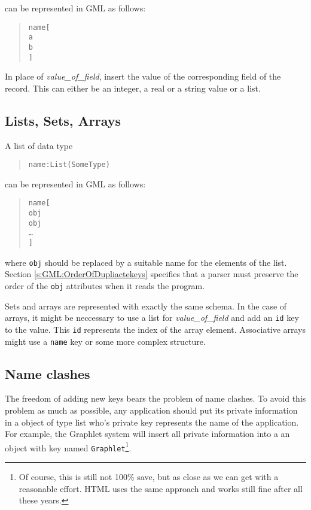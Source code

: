 \noindent can be represented in GML as follows:

\begin{quote}
\begin{alltt}
name [
    a 
    b 
    \ttcomment{\ldots{}}
]
\end{alltt}
\end{quote}

\noindent In place of \emph{value\_of\_field}, insert the value of
the corresponding field of the record. This can either be an
integer, a real or a string value or a list.


\subsection{Lists, Sets, Arrays}

A list of data type

\begin{quote}
\begin{alltt}
name: List(SomeType)
\end{alltt}
\end{quote}

\noindent can be represented in GML as follows:

\begin{quote}
\begin{alltt}
name [
  obj 
  obj 
  \ldots{}
]
\end{alltt}
\end{quote}

\noindent where \texttt{obj} should be replaced by a suitable name for the
elements of the list. Section \ref{s:GML:OrderOfDupliactekeys}
specifies that a parser must preserve the order of the
\texttt{obj} attributes when it reads the program.

Sets and arrays are represented with exactly the same schema. In
the case of arrays, it might be neccessary to use a list for
\emph{value\_of\_field} and add an \texttt{id} key to the value.
This \texttt{id} represents the index of the array element.
Associative arrays might use a \texttt{name} key or some more
complex structure.


\subsection{Name clashes}

The freedom of adding new keys bears the problem of name clashes.
To avoid this problem as much as possible, any application should
put its private information in a object of type list who's
private key represents the name of the application.  For example,
the Graphlet system will insert all private information into a an
object with key named \texttt{Graphlet}\footnote{Of course, this
  is still not 100\% save, but as close as we can get with a
  reasonable effort. HTML uses the same approach and works still
  fine after all these years.}.



